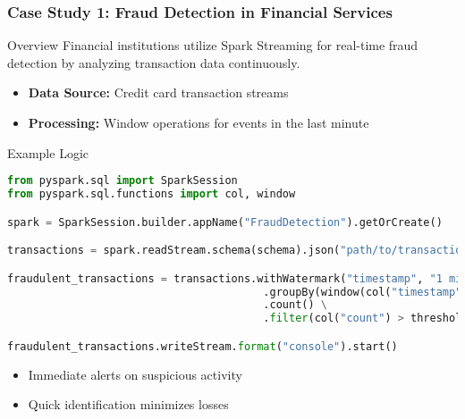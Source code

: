 \documentclass[aspectratio=169]{beamer}
\begin{document}
\begin{frame}[fragile]
    \frametitle{Case Study 1: Fraud Detection in Financial Services}

    \begin{block}{Overview}
        Financial institutions utilize Spark Streaming for real-time fraud detection by analyzing transaction data continuously.
    \end{block}

    \begin{itemize}
        \item \textbf{Data Source: } Credit card transaction streams
        \item \textbf{Processing: } Window operations for events in the last minute
    \end{itemize}

    \begin{block}{Example Logic}
        \begin{lstlisting}[language=Python]
from pyspark.sql import SparkSession
from pyspark.sql.functions import col, window

spark = SparkSession.builder.appName("FraudDetection").getOrCreate()

transactions = spark.readStream.schema(schema).json("path/to/transactions")

fraudulent_transactions = transactions.withWatermark("timestamp", "1 minute") \
                                        .groupBy(window(col("timestamp"), "1 minute"), col("user_id")) \
                                        .count() \
                                        .filter(col("count") > threshold)

fraudulent_transactions.writeStream.format("console").start()
        \end{lstlisting}
    \end{block}

    \begin{itemize}
        \item Immediate alerts on suspicious activity
        \item Quick identification minimizes losses
    \end{itemize}
\end{frame}
\end{document}
